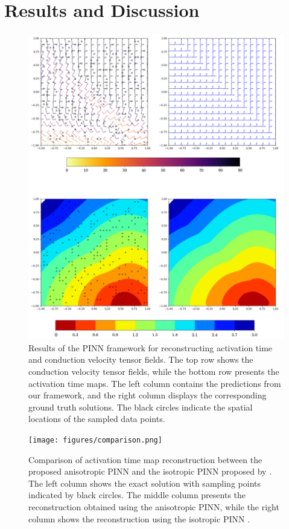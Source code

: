 \section{Results and Discussion}
\begin{figure}
    \centering
    \includegraphics[width=1\linewidth]{figures/results.png}
    \caption{Results of the PINN framework for reconstructing activation time and conduction velocity tensor fields. The top row shows the conduction velocity tensor fields, while the bottom row presents the activation time maps. The left column contains the predictions from our framework, and the right column displays the corresponding ground truth solutions. The black circles indicate the spatial locations of the sampled data points.}
    \label{fig:results}
\end{figure}
\begin{figure}
    \centering
    \texttt{[image: figures/comparison.png]} 
    \caption{Comparison of activation time map reconstruction between the proposed anisotropic PINN and the isotropic PINN proposed by \cite{SahliCostabal2020}. The left column shows the exact solution with sampling points indicated by black circles. The middle column presents the reconstruction obtained using the anisotropic PINN, while the right column shows the reconstruction using the isotropic PINN \cite{SahliCostabal2020}.}
    \label{fig:comparison}
\end{figure}
